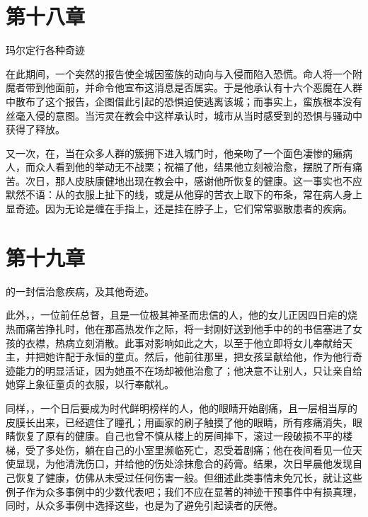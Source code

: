 
\section{第十八章}

玛尔定行各种奇迹\par

在此期间，一个突然的报告使全城因蛮族的动向与入侵而陷入恐慌。命人将一个附魔者带到他面前，并命令他宣布这消息是否属实。于是他承认有十六个恶魔在人群中散布了这个报告，企图借此引起的恐惧迫使逃离该城；而事实上，蛮族根本没有丝毫入侵的意图。当污灵在教会中这样承认时，城市从当时感受到的恐惧与骚动中获得了释放。\par

又一次，在，当在众多人群的簇拥下进入城门时，他亲吻了一个面色凄惨的癞病人，而众人看到他的举动无不战栗；祝福了他，结果他立刻被治愈，摆脱了所有痛苦。次日，那人皮肤康健地出现在教会中，感谢他所恢复的健康。这一事实也不应默然不语：从的衣服上扯下的线，或是从他穿的苦衣上取下的布条，常在病人身上显奇迹。因为无论是缠在手指上，还是挂在脖子上，它们常常驱散患者的疾病。\par


\section{第十九章}

的一封信治愈疾病，及其他奇迹。\par

此外，，一位前任总督，且是一位极其神圣而忠信的人，他的女儿正因四日疟的烧热而痛苦挣扎时，他在那高热发作之际，将一封刚好送到他手中的的书信塞进了女孩的衣襟，热病立刻消散。此事对影响如此之大，以至于他立即将女儿奉献给天主，并把她许配于永恒的童贞。然后，他前往那里，把女孩呈献给他，作为他行奇迹能力的明显活证，因为她虽不在场却被他治愈了；他决意不让别人，只让亲自给她穿上象征童贞的衣服，以行奉献礼。\par

同样，，一个日后要成为时代鲜明榜样的人，他的眼睛开始剧痛，且一层相当厚的皮膜长出来，已经遮住了瞳孔；用画家的刷子触摸了他的眼睛，所有疼痛消失，眼睛恢复了原有的健康。自己也曾不慎从楼上的房间摔下，滚过一段破损不平的楼梯，受了多处伤，躺在自己的小室里濒临死亡，忍受着剧痛；他在夜间看见一位天使显现，为他清洗伤口，并给他的伤处涂抹愈合的药膏。结果，次日早晨他发现自己恢复了健康，仿佛从未受过任何伤害一般。但细述此类事情未免冗长，就让这些例子作为众多事例中的少数代表吧；我们不应在显著的神迹干预事件中有损真理，同时，从众多事例中选择这些，也是为了避免引起读者的厌倦。\par

